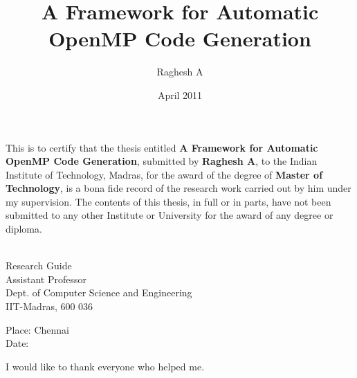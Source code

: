 \documentclass[MTech]{iitmdiss}
\def\thesistitle{A Framework for Automatic\\OpenMP Code Generation}
\def\thesisauthor{Raghesh A}
\begin{document}


\title{\thesistitle}

\author{\thesisauthor}

\date{April 2011}

\begin{singlespace}
\maketitle 
\end{singlespace} 



\certificate

\vspace*{0.5in}

\noindent This is to certify that the thesis entitled %
{\bf {A Framework for Automatic OpenMP Code Generation}},
submitted by {\bf {\thesisauthor}}, to the Indian Institute of Technology, 
Madras, for the award of the degree of {\bf Master of Technology}, 
is a bona fide record of the research work carried out by him under my
supervision. The contents of this thesis, in full or in parts, have not been
submitted to any other Institute or University for the award of any degree or
diploma.

\vspace*{1.4in}
\hspace*{-0.25in}
\begin{singlespace}
 \\
\noindent Research Guide \\ 
\noindent Assistant Professor \\
\noindent Dept. of Computer Science and Engineering\\
\noindent IIT-Madras, 600 036 \\
\end{singlespace}
\vspace*{0.20in}
\noindent Place: Chennai\\ 
Date:

\acknowledgements

I would like to thank everyone who helped me.

\end{document}
